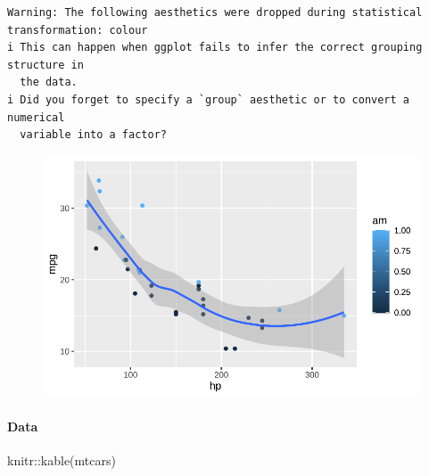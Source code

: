 \documentclass[
  letterpaper,
  DIV=11,
  numbers=noendperiod]{scrartcl}
\let\oldparagraph\paragraph
\renewcommand{\paragraph}[1]{\oldparagraph{#1}\mbox{}}
\newenvironment{Shaded}{\begin{snugshade}}{\end{snugshade}}
\newcommand{\FunctionTok}[1]{\textcolor[rgb]{0.28,0.35,0.67}{#1}}
\newcommand{\NormalTok}[1]{\textcolor[rgb]{0.00,0.23,0.31}{#1}}
\newcommand{\SpecialCharTok}[1]{\textcolor[rgb]{0.37,0.37,0.37}{#1}}
\begin{document}
\begin{verbatim}
Warning: The following aesthetics were dropped during statistical transformation: colour
i This can happen when ggplot fails to infer the correct grouping structure in
  the data.
i Did you forget to specify a `group` aesthetic or to convert a numerical
  variable into a factor?
\end{verbatim}

\begin{figure}[H]

{\centering \includegraphics{index-s-curve_files/figure-pdf/unnamed-chunk-5-1.pdf}

}

\end{figure}

\hypertarget{data-1}{%
\paragraph{Data}\label{data-1}}

\begin{Shaded}
\begin{Highlighting}[]
\NormalTok{knitr}\SpecialCharTok{::}\FunctionTok{kable}\NormalTok{(mtcars)}
\end{Highlighting}
\end{Shaded}
\end{document}
